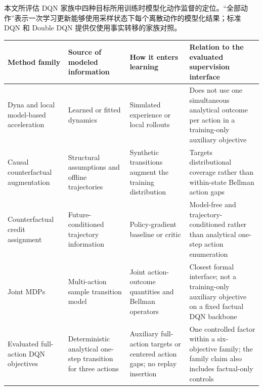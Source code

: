 \begin{table}[H]
\centering
{}
{本文所评估 DQN 家族中四种目标所用训练时模型化动作监督的定位。“全部动作”表示一次学习更新能够使用采样状态下每个离散动作的模型化结果；标准 DQN 和 Double DQN 提供仅使用事实转移的家族对照。}
\label{tab:closest_methods}
\small
\setlength{\tabcolsep}{4pt}
\begin{tabularx}{\textwidth}{>{\raggedright\arraybackslash}p{}>{\raggedright\arraybackslash}p{}>{\raggedright\arraybackslash}p{}>{\raggedright\arraybackslash}X}
\toprule
Method family & Source of modeled information & How it enters learning & Relation to the evaluated supervision interface \\
\midrule
Dyna and local model-based acceleration~\cite{sutton1991dyna,gu2016continuous} & Learned or fitted dynamics & Simulated experience or local rollouts & Does not use one simultaneous analytical outcome per action in a training-only auxiliary objective \\
Causal counterfactual augmentation~\cite{armengol2024caiac} & Structural assumptions and offline trajectories & Synthetic transitions augment the training distribution & Targets distributional coverage rather than within-state Bellman action gaps \\
Counterfactual credit assignment~\cite{mesnard2021counterfactual} & Future-conditioned trajectory information & Policy-gradient baseline or critic & Model-free and trajectory-conditioned rather than analytical one-step action enumeration \\
Joint MDPs~\cite{kaya2026joint} & Multi-action sample transition model & Joint action-outcome quantities and Bellman operators & Closest formal interface; not a training-only auxiliary objective on a fixed factual DQN backbone \\
Evaluated full-action DQN objectives & Deterministic analytical one-step transition for three actions & Auxiliary full-action targets or centered action gaps; no replay insertion & One controlled factor within a six-objective family; the family claim also includes factual-only controls \\
\bottomrule
\end{tabularx}
\end{table}
